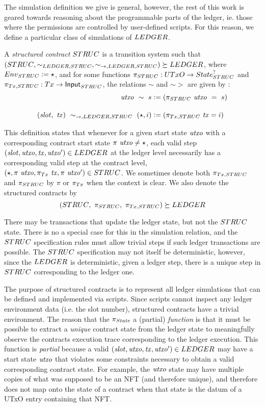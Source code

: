 The simulation definition we give is general, however, the rest of this work is
geared towards reasoning about the programmable
parts of the ledger, ie. those where the permissions are controlled by user-defined
scripts. For this reason, we define a particular class of simulations of $\LEDGER$.

A \emph{structured contract} $\STRUC$ is a transition system such that
$(\STRUC, \sim_{\LEDGER,\STRUC}, \sim_{\to,\LEDGER,\STRUC}) \succeq \LEDGER $,
where $\Env_{\STRUC} \leteq \emptytype$, and
for some functions $\pi_{\STRUC} : \UTxO \to \State_{\STRUC}^?$ and $\pi_{\Tx,\STRUC} : \Tx \to \Input_{\STRUC}$, the relations $\sim$ and $\sim >$ are given by :
\begin{align*}
  \var{utxo}~\sim~s &\leteq (\pi_{\STRUC}~\var{utxo} ~=~s)
  \nextdef
  (\var{slot},~\var{tx})~\sim_{\to,\LEDGER,\STRUC}~ (\emptytype, i) &\leteq (\pi_{\Tx,\STRUC}~\var{tx} = i)
\end{align*}

This definition states that whenever for a given start state $\mathit{utxo}$
with a corresponding contract start state $\pi~\mathit{utxo} \neq \star$,
each valid step $(\var{slot}, \var{utxo}, \var{tx}, \var{utxo'}) \in \LEDGER$
at the ledger level necessarily has a corresponding valid
step at the contract level,
$(\emptytype, \pi~\var{utxo}, \pi_{\Tx}~\var{tx}, \pi~\var{utxo'}) \in \STRUC$.
We sometimes denote both $\pi_{\Tx,\STRUC}$ and $\pi_{\STRUC}$
by $\pi$ or $\pi_{\Tx}$ when the context is clear.
We also denote the structured contracts by
\[ (\STRUC,~\pi_{\STRUC},~\pi_{\Tx,\STRUC}) \succeq \LEDGER\]

There may be transactions that update the ledger state, but not the $\STRUC$ state.
There is no a special case for this in the simulation relation, and the $\STRUC$
specification rules must allow trivial steps if such ledger transactions are possible.
The $\STRUC$ specification may not itself be deterministic, however, since the
$\LEDGER$ is deterministic, given a ledger
step, there is a unique step in $\STRUC$ corresponding to the ledger one.

The purpose of structured contracts is to represent all ledger
simulations that can be defined and implemented via scripts. Since scripts
cannot inspect any ledger environment data (i.e. the slot number), structured contracts
have a trivial environment.
The reason that the $\pi_{\State}$ a (partial) \emph{function} is that it must
be possible to extract a \emph{unique} contract state from the ledger state
to meaningfully observe the contracts execution trace corresponding to the ledger execution.
This function is \emph{partial} because a valid
$(\var{slot}, \var{utxo}, \var{tx}, \var{utxo'}) \in \LEDGER$ may have a start
state $\mathit{utxo}$ that violates some constraints necessary
to obtain a valid corresponding contract state. For example, the $\mathit{utxo}$
state may have multiple copies of what
was supposed to be an NFT (and therefore unique), and therefore does not map onto
the state of a contract when that state is the datum of a UTxO entry
containing that NFT.

